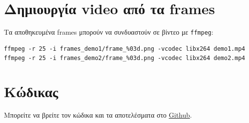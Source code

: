 \documentclass{article}
\begin{document}
\section{Δημιουργία video από τα frames}

Τα αποθηκευμένα frames μπορούν να συνδυαστούν σε βίντεο με \texttt{ffmpeg}:
\begin{lstlisting}
ffmpeg -r 25 -i frames_demo1/frame_%03d.png -vcodec libx264 demo1.mp4
ffmpeg -r 25 -i frames_demo2/frame_%03d.png -vcodec libx264 demo2.mp4
\end{lstlisting}

\section{Κώδικας}
Μπορείτε να βρείτε τον κώδικα και τα αποτελέσματα στο \href{https://github.com/charisvt/cg-auth-hw2-2026}{Github}.
\end{document}
